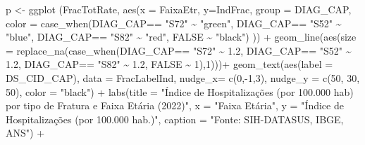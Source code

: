 \documentclass[
  letterpaper,
  DIV=11,
  numbers=noendperiod]{scrartcl}
\newenvironment{Shaded}{\begin{snugshade}}{\end{snugshade}}
\newcommand{\AttributeTok}[1]{\textcolor[rgb]{0.40,0.45,0.13}{#1}}
\newcommand{\ConstantTok}[1]{\textcolor[rgb]{0.56,0.35,0.01}{#1}}
\newcommand{\DecValTok}[1]{\textcolor[rgb]{0.68,0.00,0.00}{#1}}
\newcommand{\FloatTok}[1]{\textcolor[rgb]{0.68,0.00,0.00}{#1}}
\newcommand{\FunctionTok}[1]{\textcolor[rgb]{0.28,0.35,0.67}{#1}}
\newcommand{\NormalTok}[1]{\textcolor[rgb]{0.00,0.23,0.31}{#1}}
\newcommand{\OtherTok}[1]{\textcolor[rgb]{0.00,0.23,0.31}{#1}}
\newcommand{\SpecialCharTok}[1]{\textcolor[rgb]{0.37,0.37,0.37}{#1}}
\newcommand{\StringTok}[1]{\textcolor[rgb]{0.13,0.47,0.30}{#1}}
\begin{document}
\begin{Shaded}
\begin{Highlighting}[]
\NormalTok{p }\OtherTok{\textless{}{-}} \FunctionTok{ggplot}\NormalTok{ (FracTotRate, }\FunctionTok{aes}\NormalTok{(}\AttributeTok{x =}\NormalTok{ FaixaEtr, }\AttributeTok{y=}\NormalTok{IndFrac, }\AttributeTok{group =}\NormalTok{ DIAG\_CAP,}
                         \AttributeTok{color =} \FunctionTok{case\_when}\NormalTok{(DIAG\_CAP}\SpecialCharTok{==} \StringTok{"S72"} \SpecialCharTok{\textasciitilde{}} \StringTok{"green"}\NormalTok{,}
\NormalTok{                                           DIAG\_CAP}\SpecialCharTok{==} \StringTok{"S52"} \SpecialCharTok{\textasciitilde{}} \StringTok{"blue"}\NormalTok{,}
\NormalTok{                                           DIAG\_CAP}\SpecialCharTok{==} \StringTok{"S82"} \SpecialCharTok{\textasciitilde{}} \StringTok{"red"}\NormalTok{,}
                                           \ConstantTok{FALSE} \SpecialCharTok{\textasciitilde{}} \StringTok{"black"}\NormalTok{)}
\NormalTok{)) }\SpecialCharTok{+}
  \FunctionTok{geom\_line}\NormalTok{(}\FunctionTok{aes}\NormalTok{(}\AttributeTok{size =} \FunctionTok{replace\_na}\NormalTok{(}\FunctionTok{case\_when}\NormalTok{(DIAG\_CAP}\SpecialCharTok{==} \StringTok{"S72"} \SpecialCharTok{\textasciitilde{}} \FloatTok{1.2}\NormalTok{,}
\NormalTok{                                            DIAG\_CAP}\SpecialCharTok{==} \StringTok{"S52"} \SpecialCharTok{\textasciitilde{}} \FloatTok{1.2}\NormalTok{,}
\NormalTok{                                            DIAG\_CAP}\SpecialCharTok{==} \StringTok{"S82"} \SpecialCharTok{\textasciitilde{}} \FloatTok{1.2}\NormalTok{,}
                                            \ConstantTok{FALSE} \SpecialCharTok{\textasciitilde{}} \DecValTok{1}\NormalTok{),}\DecValTok{1}\NormalTok{)))}\SpecialCharTok{+}
  \FunctionTok{geom\_text}\NormalTok{(}\FunctionTok{aes}\NormalTok{(}\AttributeTok{label =}\NormalTok{ DS\_CID\_CAP), }\AttributeTok{data =}\NormalTok{ FracLabelInd, }\AttributeTok{nudge\_x=} \FunctionTok{c}\NormalTok{(}\DecValTok{0}\NormalTok{,}\SpecialCharTok{{-}}\DecValTok{1}\NormalTok{,}\DecValTok{3}\NormalTok{), }\AttributeTok{nudge\_y =} \FunctionTok{c}\NormalTok{(}\DecValTok{50}\NormalTok{, }\DecValTok{30}\NormalTok{, }\DecValTok{50}\NormalTok{), }\AttributeTok{color =} \StringTok{"black"}\NormalTok{) }\SpecialCharTok{+}
  \FunctionTok{labs}\NormalTok{(}\AttributeTok{title =} \StringTok{"Índice de Hospitalizações (por 100.000 hab) por tipo de Fratura e Faixa Etária (2022)"}\NormalTok{, }\AttributeTok{x =} \StringTok{"Faixa Etária"}\NormalTok{, }\AttributeTok{y =} \StringTok{"Índice de Hospitalizações (por 100.000 hab.)"}\NormalTok{, }\AttributeTok{caption =} \StringTok{"Fonte: SIH{-}DATASUS, IBGE, ANS"}\NormalTok{) }\SpecialCharTok{+}

\end{Highlighting}
\end{Shaded}
\end{document}

